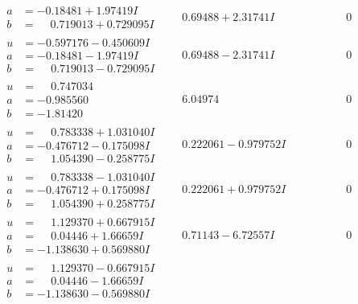 \documentclass[1p]{elsarticle_modified}
\theoremstyle{definition}
\begin{document}
$$\begin{array}{c|c|c}
\begin{aligned}
a &= -0.18481 + 1.97419 I \\
b &= \phantom{-}0.719013 + 0.729095 I\end{aligned}
 & \phantom{-}0.69488 + 2.31741 I & \phantom{-0.000000 } 0 \\ \hline\begin{aligned}
u &= -0.597176 - 0.450609 I \\
a &= -0.18481 - 1.97419 I \\
b &= \phantom{-}0.719013 - 0.729095 I\end{aligned}
 & \phantom{-}0.69488 - 2.31741 I & \phantom{-0.000000 } 0 \\ \hline\begin{aligned}
u &= \phantom{-}0.747034\phantom{ +0.000000I} \\
a &= -0.985560\phantom{ +0.000000I} \\
b &= -1.81420\phantom{ +0.000000I}\end{aligned}
 & \phantom{-}6.04974\phantom{ +0.000000I} & \phantom{-0.000000 } 0 \\ \hline\begin{aligned}
u &= \phantom{-}0.783338 + 1.031040 I \\
a &= -0.476712 - 0.175098 I \\
b &= \phantom{-}1.054390 - 0.258775 I\end{aligned}
 & \phantom{-}0.222061 - 0.979752 I & \phantom{-0.000000 } 0 \\ \hline\begin{aligned}
u &= \phantom{-}0.783338 - 1.031040 I \\
a &= -0.476712 + 0.175098 I \\
b &= \phantom{-}1.054390 + 0.258775 I\end{aligned}
 & \phantom{-}0.222061 + 0.979752 I & \phantom{-0.000000 } 0 \\ \hline\begin{aligned}
u &= \phantom{-}1.129370 + 0.667915 I \\
a &= \phantom{-}0.04446 + 1.66659 I \\
b &= -1.138630 + 0.569880 I\end{aligned}
 & \phantom{-}0.71143 - 6.72557 I & \phantom{-0.000000 } 0 \\ \hline\begin{aligned}
u &= \phantom{-}1.129370 - 0.667915 I \\
a &= \phantom{-}0.04446 - 1.66659 I \\
b &= -1.138630 - 0.569880 I\end{aligned}

\end{array}$$
\end{document}
